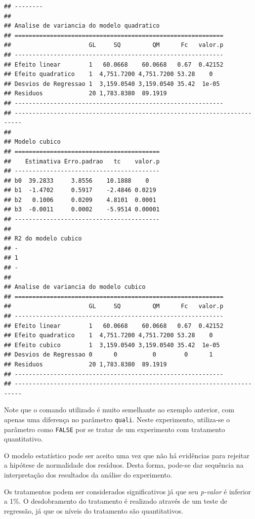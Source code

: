 \documentclass[
]{article}
\begin{document}
\begin{verbatim}
## --------
## 
## Analise de variancia do modelo quadratico
## ===========================================================
##                      GL     SQ         QM      Fc   valor.p
## -----------------------------------------------------------
## Efeito linear        1   60.0668    60.0668   0.67  0.42152
## Efeito quadratico    1  4,751.7200 4,751.7200 53.28    0   
## Desvios de Regressao 1  3,159.0540 3,159.0540 35.42  1e-05 
## Residuos             20 1,783.8380  89.1919                
## -----------------------------------------------------------
## ------------------------------------------------------------------------
## 
## Modelo cubico
## =========================================
##    Estimativa Erro.padrao   tc    valor.p
## -----------------------------------------
## b0  39.2833     3.8556    10.1888    0   
## b1  -1.4702     0.5917    -2.4846 0.0219 
## b2   0.1006     0.0209    4.8101  0.0001 
## b3  -0.0011     0.0002    -5.9514 0.00001
## -----------------------------------------
## 
## R2 do modelo cubico
## -
## 1
## -
## 
## Analise de variancia do modelo cubico
## ===========================================================
##                      GL     SQ         QM      Fc   valor.p
## -----------------------------------------------------------
## Efeito linear        1   60.0668    60.0668   0.67  0.42152
## Efeito quadratico    1  4,751.7200 4,751.7200 53.28    0   
## Efeito cubico        1  3,159.0540 3,159.0540 35.42  1e-05 
## Desvios de Regressao 0      0          0        0      1   
## Residuos             20 1,783.8380  89.1919                
## -----------------------------------------------------------
## ------------------------------------------------------------------------
\end{verbatim}

Note que o comando utilizado é muito semelhante ao exemplo anterior, com apenas uma diferença no parâmetro \texttt{quali}. Neste experimento, utiliza-se o parâmetro como \texttt{FALSE} por se tratar de um experimento com tratamento quantitativo.

O modelo estatístico pode ser aceito uma vez que não há evidências para rejeitar a hipótese de normalidade dos resíduos. Desta forma, pode-se dar sequência na interpretação dos resultados da análise do experimento.

Os tratamentos podem ser considerados significativos já que seu \emph{p-valor} é inferior a 1\%. O desdobramento do tratamento é realizado através de um teste de regressão, já que os níveis do tratamento são quantitativos.
\end{document}
